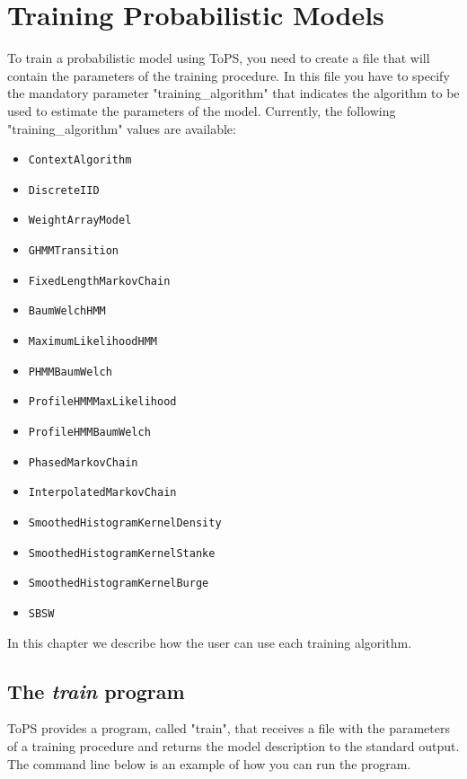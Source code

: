 \chapter{Training Probabilistic Models}

To train a probabilistic model using ToPS, you need to create a file that will contain the parameters of the training procedure. 
 In this file you have to specify the mandatory parameter "training\_algorithm"  that indicates the algorithm to be used to estimate the parameters of the model. Currently, the following "training\_algorithm"  values are available:

\begin{itemize}
\item \texttt{ContextAlgorithm}
\item \texttt{DiscreteIID}
\item \texttt{WeightArrayModel}
\item \texttt{GHMMTransition}
\item \texttt{FixedLengthMarkovChain}
\item \texttt{BaumWelchHMM}
\item \texttt{MaximumLikelihoodHMM}
\item \texttt{PHMMBaumWelch}
\item \texttt{ProfileHMMMaxLikelihood}
\item \texttt{ProfileHMMBaumWelch}
\item \texttt{PhasedMarkovChain}
\item \texttt{InterpolatedMarkovChain}
\item \texttt{SmoothedHistogramKernelDensity}
\item \texttt{SmoothedHistogramKernelStanke}
\item \texttt{SmoothedHistogramKernelBurge}
\item \texttt{SBSW}
\end{itemize}

In this chapter we describe how the user can use each training algorithm.

\section{The \textit{train} program}


ToPS provides a program, called "train", that receives a file with the parameters of a training procedure and returns the model description to the standard output. The command line below is an example of how you can run the program.

